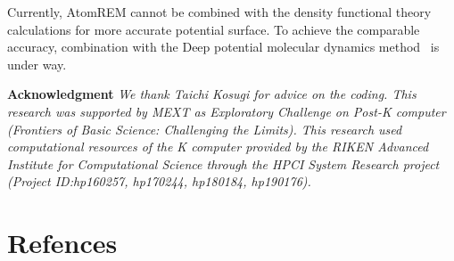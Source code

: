 \documentclass[preprint,12pt]{elsarticle}
\begin{document}
Currently, AtomREM cannot be combined with the density functional theory calculations for more accurate potential surface. To achieve the comparable accuracy, combination with the Deep potential molecular dynamics method~\cite{DPMD} is under way.

\bigskip
{\bf Acknowledgment} {\itshape We thank Taichi Kosugi for advice on the coding. This research was supported by MEXT as Exploratory Challenge on Post-K computer (Frontiers of Basic Science: Challenging the Limits). This research used computational resources of the K computer provided by the RIKEN Advanced Institute for Computational Science through the HPCI System Research project (Project ID:hp160257, hp170244, hp180184, hp190176).}



\newpage


\newpage


\newpage

\section{Refences}


\end{document}
